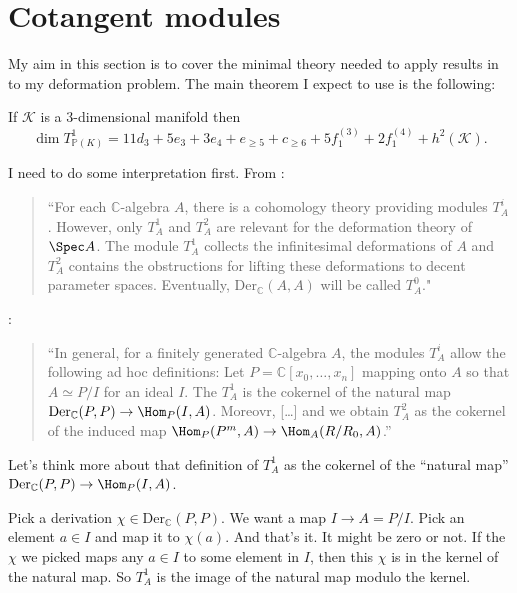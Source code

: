 \documentclass{book}
\begin{document}
\section{Cotangent modules}
\label{section-cotangent-modules}

\noindent
My aim in this section is to cover the
minimal
theory needed to apply results in \cite{jan2}
to my deformation problem. The main theorem
I expect to use is the following:

\begin{theorem}
\label{theorem-deformations-threefolds}
\begin{reference}
\cite[Theorem 5.7]{jan2}
\end{reference}
If $\mathcal{K}$ is a 3-dimensional manifold
then
$$
\dim T^1_{\mathbb{P}(K)}
=11d_3+5e_3+3e_4+e_{\geq 5}+c_{\geq
6}+5f_1^{(3)}+2f_1^{(4)}+h^2(\mathcal{K}).
$$
\end{theorem}

\noindent
I need to do some interpretation first.
From \cite[p. 1]{jan3}:

\begin{quotation}
  ``For each $\mathbb{C}$-algebra $A$,
there is a cohomology theory providing
modules $T^i_A$.
However, only $T^1_A$ and $T^2_A$ are
relevant for the deformation
theory of $\Spec A$. The module $T^1_A$
collects the infinitesimal
deformations of $A$ and $T^2_A$ contains the
obstructions
for lifting these deformations to decent
parameter spaces.
Eventually, $\text{Der}_{\mathbb{C}}(A,A)$
will be called $T_A^0$."
\end{quotation}

\cite[p. 3]{jan3}:
\begin{quotation}
``In general, for a finitely generated
$\mathbb{C}$-algebra $A$,
the modules $T_A^i$ allow the following ad
hoc definitions:
Let $P=\mathbb{C}[x_0,…,x_n]$ mapping onto
$A$ so that $A \simeq P/I$
for an ideal $I$. The $T_A^1$ is the cokernel
of the natural map
$\text{Der}_{\mathbb{C}}(P,P) \to
\Hom_P(I,A)$.
Moreovr, […] and we obtain $T^2_A$ as the
cokernel
of the induced map
$\Hom_P(P^m,A)\to\Hom_A(R/R_0,A)$.''
\end{quotation}

\begin{remark}[dani]
\label{remark-dani1}
Let's think more about that definition of
$T^1_A$
as the cokernel of the ``natural map''
$\text{Der}_\mathbb{C}(P,P) \to \Hom_P(I,A)$.

Pick a derivation $\chi \in
\text{Der}_{\mathbb{C}}(P,P)$.
We want a map $I \to A=P/I$.
Pick an element $a \in I$ and map it to
$\chi(a)$.
And that's it. It might be zero or not.
If the $\chi$ we picked maps any $a \in I$ to
some element in $I$,
then this $\chi$ is in the kernel of the
natural map.
So $T^1_A$ is the image of the natural map
modulo the kernel.
\end{remark}
\end{document}
